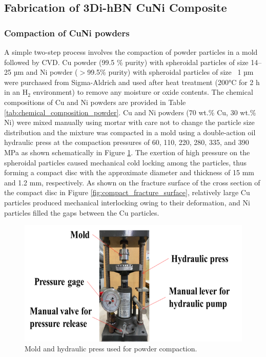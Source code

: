 \subsection{Fabrication of 3Di-hBN CuNi Composite}

\subsubsection{Compaction of CuNi powders}
A simple two-step process involves the compaction of powder particles in a mold followed by CVD. Cu powder (99.5 \% purity) with spheroidal particles of size 14–25 µm and Ni powder ($>$99.5\% purity) with spheroidal particles of size ~1 µm were purchased from Sigma-Aldrich and used after heat treatment (200°C for 2 h in an $\text{H}_{2}$ environment) to remove any moisture or oxide contents. The chemical compositions of Cu and Ni powders are provided in Table \ref{tab:chemical_composition_powder}. Cu and Ni powders (70 wt.\% Cu, 30 wt.\% Ni) were mixed manually using mortar with care not to change the particle size distribution and the mixture was compacted in a mold using a double-action oil hydraulic press at the compaction pressures of 60, 110, 220, 280, 335, and 390 MPa as shown schematically in Figure \ref{fig:Mold_and_press}. The exertion of high pressure on the spheroidal particles caused mechanical cold locking among the particles, thus forming a compact disc with the approximate diameter and thickness of 15 mm and 1.2 mm, respectively. As shown on the fracture surface of the cross section of the compact disc in Figure \ref{fig:compact_fracture_surface}, relatively large Cu particles produced mechanical interlocking owing to their deformation, and Ni particles filled the gaps between the Cu particles.

\begin{figure}[!htb]
\centering
\includegraphics[scale=1.0]{graphics/chapter_2/Mold_and_press}
\caption{Mold and hydraulic press used for powder compaction.}
\label{fig:Mold_and_press}
\end{figure}

